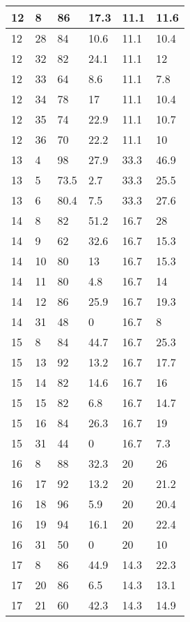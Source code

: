 \begin{longtable}[c]{ | p{2cm} | p{2cm} | p{2cm} | p{2cm} | p{3cm} | p{3cm} | }
	\hline
	12 & 8 & 86 & 17.3 & 11.1 & 11.6 \\
	\hline
	12 & 28 & 84 & 10.6 & 11.1 & 10.4 \\
	\hline
	12 & 32 & 82 & 24.1 & 11.1 & 12 \\
	\hline
	12 & 33 & 64 & 8.6 & 11.1 & 7.8 \\
	\hline
	12 & 34 & 78 & 17 & 11.1 & 10.4 \\
	\hline
	12 & 35 & 74 & 22.9 & 11.1 & 10.7 \\
	\hline
	12 & 36 & 70 & 22.2 & 11.1 & 10 \\
	\hline
	\hline
	\hline
	13 & 4 & 98 & 27.9 & 33.3 & 46.9 \\
	\hline
	13 & 5 & 73.5 & 2.7 & 33.3 & 25.5 \\
	\hline
	13 & 6 & 80.4 & 7.5 & 33.3 & 27.6 \\
	\hline
	\hline
	\hline
	14 & 8 & 82 & 51.2 & 16.7 & 28 \\
	\hline
	14 & 9 & 62 & 32.6 & 16.7 & 15.3 \\
	\hline
	14 & 10 & 80 & 13 & 16.7 & 15.3 \\
	\hline
	14 & 11 & 80 & 4.8 & 16.7 & 14 \\
	\hline
	14 & 12 & 86 & 25.9 & 16.7 & 19.3 \\
	\hline
	14 & 31 & 48 & 0 & 16.7 & 8 \\
	\hline
	\hline
	\hline
	15 & 8 & 84 & 44.7 & 16.7 & 25.3 \\
	\hline
	15 & 13 & 92 & 13.2 & 16.7 & 17.7 \\
	\hline
	15 & 14 & 82 & 14.6 & 16.7 & 16 \\
	\hline
	15 & 15 & 82 & 6.8 & 16.7 & 14.7 \\
	\hline
	15 & 16 & 84 & 26.3 & 16.7 & 19 \\
	\hline
	15 & 31 & 44 & 0 & 16.7 & 7.3 \\
	\hline
	\hline
	\hline
	16 & 8 & 88 & 32.3 & 20 & 26 \\
	\hline
	16 & 17 & 92 & 13.2 & 20 & 21.2 \\
	\hline
	16 & 18 & 96 & 5.9 & 20 & 20.4 \\
	\hline
	16 & 19 & 94 & 16.1 & 20 & 22.4 \\
	\hline
	16 & 31 & 50 & 0 & 20 & 10 \\
	\hline
	\hline
	\hline
	17 & 8 & 86 & 44.9 & 14.3 & 22.3 \\
	\hline
	17 & 20 & 86 & 6.5 & 14.3 & 13.1 \\
	\hline
	17 & 21 & 60 & 42.3 & 14.3 & 14.9 \\

\end{longtable}
